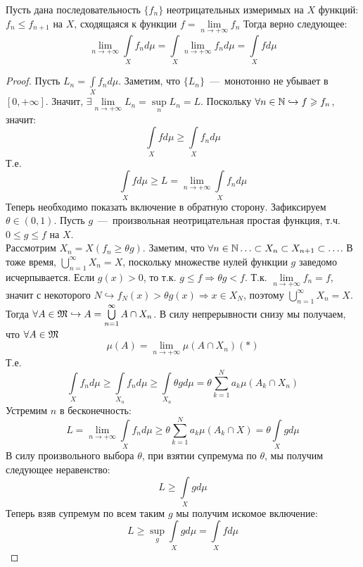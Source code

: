 \hypertarget{beppo_levi}{}
\begin{theorem}
    Пусть дана последовательность $\{f_n\}$ неотрицательных измеримых на $X$ функций: $f_n \leq f_{n + 1}$ на $X$, сходящаяся к функции $f = \lim\limits_{n \rightarrow +\infty} f_n$ Тогда верно следующее: \[\lim\limits_{n \rightarrow +\infty} \int\limits_X f_nd\mu = \int\limits_X \lim\limits_{n \rightarrow +\infty} f_n d\mu = \int\limits_X fd\mu\]
\end{theorem}
\begin{proof}
    Пусть $L_n = \int\limits_X f_nd\mu$. Заметим, что $\{L_n\}$~---~монотонно не убывает в $[0, +\infty]$. Значит, $\exists \lim\limits_{n\rightarrow+\infty} L_n = \sup\limits_n L_n = L$. Поскольку $\forall n \in \mathbb{N} \hookrightarrow f \geqslant f_n$, значит: \[\int\limits_X fd\mu \geq \int\limits_X f_nd\mu\]
    Т.е. \[\int\limits_X fd\mu \geq L = \lim\limits_{n \rightarrow +\infty} \int\limits_X f_nd\mu\]
    Теперь необходимо показать включение в обратную сторону. Зафиксируем $\theta \in (0, 1)$. Пусть $g$~---~произвольная неотрицательная простая функция, т.ч. $0 \leq g \leq f$ на $X$.\\ Рассмотрим $X_n = X(f_n \geq \theta g)$. Заметим, что $ \forall n \in \mathbb{N} \ldots \subset X_n \subset X_{n + 1} \subset \ldots$. В тоже время, $\bigcup\limits_{n = 1}^\infty X_n = X$, поскольку множестве нулей функции $g$ заведомо исчерпывается. Если $g(x) > 0$, то т.к. $g \leq f \Rightarrow \theta g < f$. Т.к. $\lim\limits_{n\rightarrow +\infty}f_n = f$, значит с некоторого $N \hookrightarrow f_N(x) > \theta g(x) \Rightarrow x \in X_N$, поэтому $\bigcup\limits_{n = 1}^\infty X_n = X$. \\
    Тогда $\forall A \in \mathfrak{M} \hookrightarrow A = \bigcup\limits_{n = 1}^\infty A \cap X_n$. В силу непрерывности снизу мы получаем, что $\forall A \in \mathfrak{M}$ \[\mu(A) = \lim\limits_{n \rightarrow +\infty} \mu(A \cap X_n) (*)\]
    Т.е. \[\int\limits_X f_nd\mu \geq \int\limits_{X_n} f_nd\mu \geq \int\limits_{X_n} \theta g d\mu = \theta \sum\limits_{k = 1}^N a_k\mu(A_k \cap X_n)\]
    Устремим $n$ в бесконечность:
    \[L = \lim\limits_{n \rightarrow +\infty} \int\limits_X f_nd\mu \geq \theta\sum\limits_{k = 1}^N a_k\mu(A_k \cap X) = \theta\int\limits_{X} gd\mu \]
    В силу произвольного выбора $\theta$, при взятии супремума по $\theta$, мы получим следующее неравенство: \[L \geq \int\limits_X gd\mu\]
    Теперь взяв супремум по всем таким $g$ мы получим искомое включение: \[L \geq \sup\limits_g \int\limits_X gd\mu = \int\limits_X fd\mu\]
\end{proof} 


